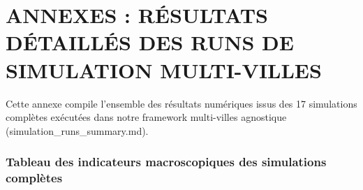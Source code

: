 \documentclass[10pt, a4paper]{article}
\begin{document}
\newpage

\section{ANNEXES : RÉSULTATS DÉTAILLÉS DES RUNS DE SIMULATION
MULTI-VILLES}\label{annexes-ruxe9sultats-duxe9tailluxe9s-des-runs-de-simulation-multi-villes}

Cette annexe compile l'ensemble des résultats numériques issus des 17
simulations complètes exécutées dans notre framework multi-villes
agnostique (simulation\_runs\_summary.md).

\subsubsection{Tableau des indicateurs macroscopiques des simulations
complètes}\label{tableau-des-indicateurs-macroscopiques-des-simulations-compluxe8tes}
\end{document}
